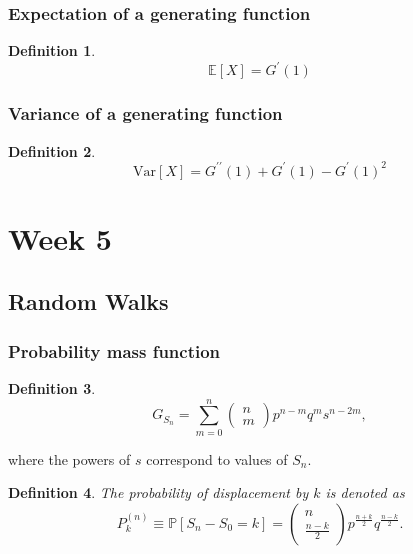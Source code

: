 \documentclass{article}
\newtheorem{definition}{Definition}
\newcommand{\Prob}{\mathbb{P}}
\newcommand{\E}{\mathbb{E}}
\newcommand{\Var}{\text{Var}}
\begin{document}
\subsubsection{Expectation of a generating function}
\begin{definition}
    \begin{equation}
        \E[X]=G^\prime (1)
    \end{equation}
\end{definition}
\subsubsection{Variance of a generating function}
\begin{definition}
    \begin{equation}
        \Var[X] = G^{\prime\prime}(1) + G^\prime(1)-G^\prime(1)^2
    \end{equation}
\end{definition}



\section{Week 5}
\subsection{Random Walks}
\subsubsection{Probability mass function}
\begin{definition}
    \begin{equation}
        G_{S_n}=\sum_{m=0}^n \begin{pmatrix} n \\ m \end{pmatrix} p^{n-m}q^{m}s^{n-2m},
    \end{equation}
\end{definition}
where the powers of $s$ correspond to values of $S_n$.
\begin{definition}
    The probability of displacement by $k$ is denoted as
    \begin{equation}
        P_k^{(n)} \equiv \Prob[S_n-S_0=k]=\begin{pmatrix} n \\ \frac{n-k}{2} \end{pmatrix}p^{\frac{n+k}{2}}q^{\frac{n-k}{2}}.
    \end{equation}
\end{definition}
\end{document}
